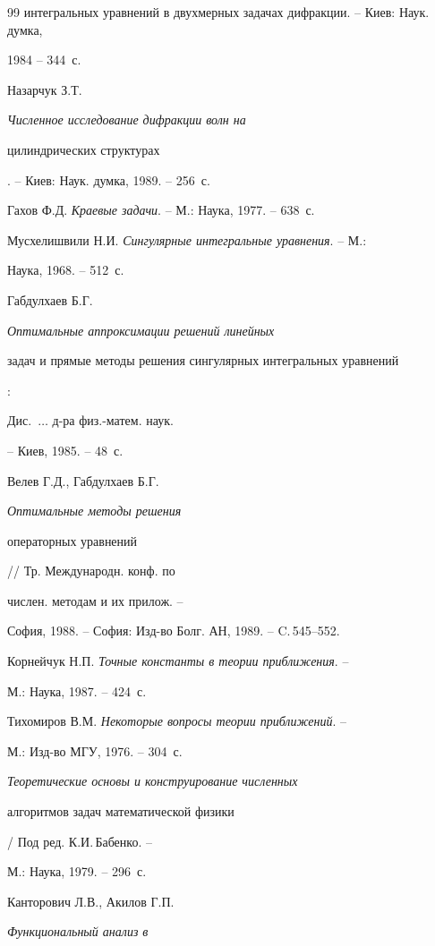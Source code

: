 \begin{thebibliography}{99}
{интегральных уравнений в двухмерных задачах дифракции}. -- Киев: Наук. думка,


1984 -- 344~с.




Назарчук З.Т. {\em Численное исследование дифракции волн на


цилиндрических структурах}. -- Киев: Наук. думка, 1989. -- 256~с.




Гахов Ф.Д. {\em Краевые задачи}. -- М.: Наука, 1977. -- 638~с.




Мусхелишвили Н.И. {\em Сингулярные интегральные уравнения}. -- М.:


Наука, 1968. -- 512~с.




Габдулхаев Б.Г. {\em Оптимальные аппроксимации решений линейных


задач и прямые методы решения сингулярных интегральных уравнений}:


Дис.~$\dotsc$ д-ра физ.-матем. наук.


-- Киев, 1985. -- 48~с.




Велев Г.Д., Габдулхаев Б.Г. {\em Оптимальные методы решения


операторных уравнений} // Тр. Международн. конф. по


числен. методам и их прилож. --


София, 1988. -- София: Изд-во Болг. АН, 1989. -- C.\,545--552.




Корнейчук Н.П. {\em Точные константы в теории приближения}. --


М.: Наука, 1987. -- 424~с.




Тихомиров В.М. {\em Некоторые вопросы теории приближений}. --


М.: Изд-во МГУ, 1976. -- 304~с.




{\em Теоретические основы и конструирование численных


алгоритмов задач математической физики} / Под ред. К.И.\,Бабенко. --


М.: Наука, 1979. -- 296~с.




Канторович Л.В., Акилов Г.П. {\em Функциональный анализ в


}
\end{thebibliography}
